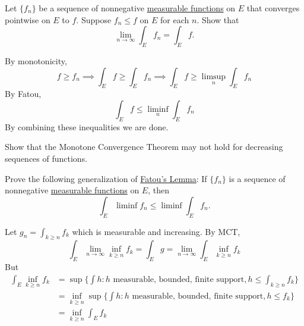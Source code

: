   \begin{exercise}[Royden 4.25]
    Let $\{f_n\}$ be a sequence of nonnegative \hyperref[def:measurable-function]{measurable functions} on $E$ that converges pointwise on $E$ to $f$. Suppose $f_n \leq f$ on $E$ for each $n$. Show that
    \begin{equation*}
      \lim_{n \to \infty} \int_E f_n = \int_E f.
    \end{equation*}
  \end{exercise}
  \begin{solution}
    By monotonicity, 
    \begin{equation}
      f \geq f_n \implies \int_E f \geq \int_E f_n \implies \int_E f \geq \limsup_n \int_E f_n
    \end{equation}
    By Fatou, 
    \begin{equation}
      \int_E f \leq \liminf_n \int_E f_n 
    \end{equation}
    By combining these inequalities we are done. 
  \end{solution}

  \begin{exercise}[Royden 4.26]
    Show that the Monotone Convergence Theorem may not hold for decreasing sequences of functions.
  \end{exercise}

  \begin{exercise}[Royden 4.27]
    Prove the following generalization of \hyperref[thm:fatous-lemma]{Fatou's Lemma}: If $\{f_n\}$ is a sequence of nonnegative \hyperref[def:measurable-function]{measurable functions} on $E$, then
    \begin{equation*}
      \int_E \liminf f_n \leq \liminf \int_E f_n.
    \end{equation*}
  \end{exercise}
  \begin{solution}
    Let $g_n = \int_{k \geq n} f_k$ which is measurable and increasing. By MCT, 
    \begin{equation}
      \int_E \lim_{n \to \infty} \inf_{k \geq n} f_k = \int_E g = \lim_{n \to \infty} \int_E \inf_{k \geq n} f_k 
    \end{equation}
    But 
    \begin{align}
      \int_E \inf_{k \geq n} f_k & = \sup \bigg\{ \int h \colon h \text{ measurable, bounded, finite support}, h \leq \int_{k \geq n} f_k \bigg\} \\ 
                                 & = \inf_{k \geq n} \sup \bigg\{ \int h \colon h \text{ measurable, bounded, finite support}, h \leq f_k \bigg\} \\ 
                                 & = \inf_{k \geq n} \int_E f_k
    \end{align}
  \end{solution}

